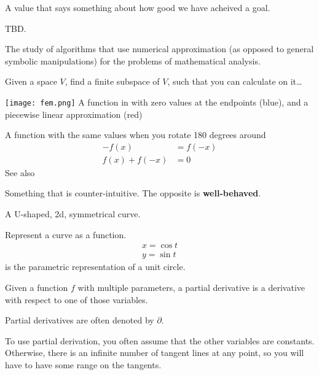 \begin{definition}
    A value that says something about how good we have acheived a goal.
\end{definition}

\begin{definition}[Moment]
    TBD.\
\end{definition}

\begin{definition}
    The study of algorithms that use numerical approximation (as opposed to
    general symbolic manipulations) for the problems of mathematical analysis.

    Given a space $V$, find a finite subspace of $V$, such that you can
    calculate on it\dots

    \texttt{[image: fem.png]}
    A function in  with zero values at the endpoints (blue), and a piecewise
    linear approximation (red)

\end{definition}

\begin{definition}[Odd function]\label{oddfunc}
A function with the same values when you rotate 180 degrees around\dotso{}
    \begin{align}
        - f(x) &= f(-x) \\
        f(x) + f(-x) &= 0
    \end{align}
    See also~
\end{definition}

\begin{definition}[Pathological]
    Something that is counter-intuitive. The opposite is \textbf{well-behaved}.

\end{definition}

\begin{definition}[Parabola]
    A U-shaped, 2d, symmetrical curve.
\end{definition}

\begin{definition}[Parameterization]
    Represent a curve as a function.
    \begin{align}
        x = \cos{t} \\
        y = \sin{t}
    \end{align}
    is the parametric representation of a unit circle.

\begin{definition}
    Given a function $f$ with multiple parameters, a partial derivative is a
    derivative with respect to one of those variables.

    Partial derivatives are often denoted by $\partial$.

    To use partial derivation, you often assume that the other variables are 
    constants. Otherwise, there is an infinite number of tangent lines at
    any point, so you will have to have some range on the tangents.

\end{definition}

\end{definition}

